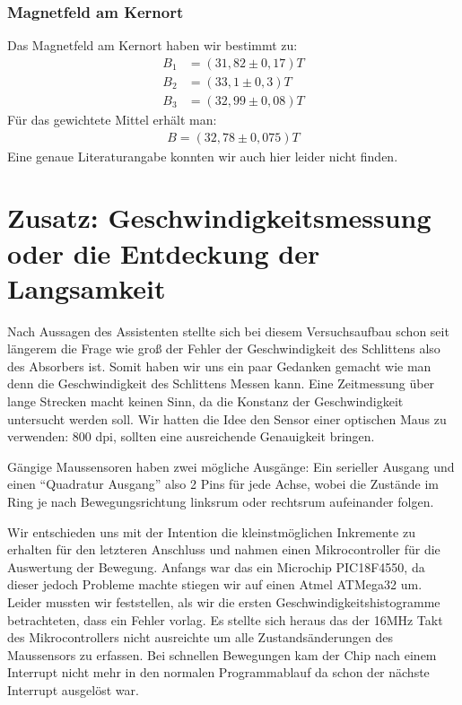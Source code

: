 \documentclass[12pt]{article}
\begin{document}
\subsubsection*{Magnetfeld am Kernort}
Das Magnetfeld am Kernort haben wir bestimmt zu:
\begin{align*}
  B_1 &= (31,82\pm0,17)T \\
 B_2 &= (33,1\pm0,3)T \\
 B_3 &= (32,99\pm0,08)T
\end{align*}
Für das gewichtete Mittel erhält man:
\begin{align*}
 B = (32,78 \pm 0,075)T
\end{align*}
Eine genaue Literaturangabe konnten wir auch hier leider nicht finden.


\section{Zusatz: Geschwindigkeitsmessung oder die Entdeckung der Langsamkeit}
Nach Aussagen des Assistenten stellte sich bei diesem Versuchsaufbau schon seit längerem die Frage wie groß der Fehler der Geschwindigkeit des Schlittens also des Absorbers ist. Somit haben wir uns ein paar Gedanken gemacht wie man denn die Geschwindigkeit des Schlittens Messen kann. Eine Zeitmessung über lange Strecken macht keinen Sinn, da die Konstanz der Geschwindigkeit untersucht werden soll. Wir hatten die Idee den Sensor einer optischen Maus zu verwenden: 800 dpi, sollten eine ausreichende Genauigkeit bringen.

Gängige Maussensoren haben zwei mögliche Ausgänge: Ein serieller Ausgang und einen ``Quadratur Ausgang'' also 2 Pins für jede Achse, wobei die Zustände im Ring je nach Bewegungsrichtung linksrum oder rechtsrum aufeinander folgen.

Wir entschieden uns mit der Intention die kleinstmöglichen Inkremente zu erhalten für den letzteren Anschluss und nahmen einen Mikrocontroller für die Auswertung 
der Bewegung. Anfangs war das ein Microchip PIC18F4550, da dieser jedoch Probleme machte stiegen wir auf einen Atmel ATMega32 um. Leider mussten wir feststellen,
 als wir die ersten Geschwindigkeitshistogramme betrachteten, dass ein Fehler vorlag. Es stellte sich heraus das der 16MHz Takt des Mikrocontrollers nicht
 ausreichte um alle Zustandsänderungen des Maussensors zu erfassen. Bei schnellen Bewegungen kam der Chip nach einem Interrupt nicht mehr in den normalen Programmablauf da schon der nächste Interrupt ausgelöst war.
\end{document}
